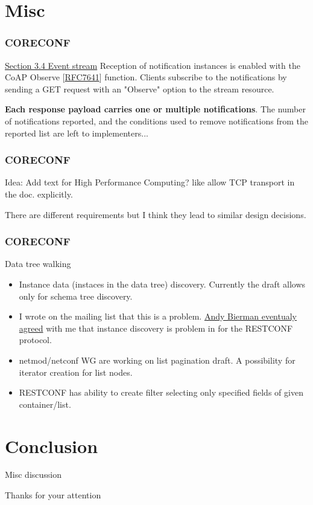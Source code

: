 \documentclass{beamer}
\begin{document}
\section{Misc}
\begin{frame}
	\frametitle{CORECONF}

	\begin{block}{\href{https://www.ietf.org/archive/id/draft-ietf-core-comi-21.html\#name-event-stream}{Section 3.4 Event stream}}
	  Reception of notification instances is enabled with the CoAP Observe [\href{https://datatracker.ietf.org/doc/html/rfc7641}{RFC7641}]
	  function. Clients subscribe to the notifications by sending a GET request with an "Observe" option to the stream resource.
	
	  \textbf{Each response payload carries one or multiple notifications}. The number of notifications reported, and the conditions used to remove notifications from the reported list are left to implementers...
	\end{block}
\end{frame}

\begin{frame}
  \frametitle{CORECONF}
  Idea: Add text for High Performance Computing? like allow TCP transport in the doc. explicitly.

  There are different requirements but I think they lead to similar design decisions.
\end{frame}

\begin{frame}
	\frametitle{CORECONF}

	\begin{block}{Data tree walking}
	\begin{itemize}
		\item Instance data (instaces in the data tree) discovery. Currently the draft allows only
		for schema tree discovery.
	
	      \item I wrote on the mailing list that this is a problem. 
		\href{https://mailarchive.ietf.org/arch/msg/core/WmnnQGibr3KLyGIO2NWiabs6l4A/}{Andy Bierman eventualy agreed}
		with me that instance discovery is problem
		in for the RESTCONF protocol.
	
		\item netmod/netconf WG are working on list pagination draft. A possibility for 
		iterator creation for list nodes.
	
		\item RESTCONF has ability to create filter selecting only specified fields of given
		container/list. 
	\end{itemize}
	\end{block}
\end{frame}

\section{Conclusion}
\begin{frame}
	\begin{block}{Misc discussion}
	\end{block}
	
	\begin{block}{Thanks for your attention}
	\end{block}
\end{frame}
\end{document}
